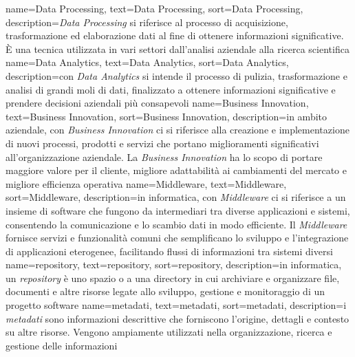 {
    name={Data Processing},
    text=Data Processing,
    sort=Data Processing,
    description={\textit{Data Processing} si riferisce al processo di acquisizione, trasformazione ed elaborazione dati al fine di 
    ottenere informazioni significative. È una tecnica utilizzata in vari settori dall'analisi aziendale alla ricerca scientifica}
}
{
    name={Data Analytics},
    text=Data Analytics,
    sort=Data Analytics,
    description={con \textit{Data Analytics} si intende il processo di pulizia, trasformazione e analisi di grandi moli di dati, finalizzato
    a ottenere informazioni significative e prendere decisioni aziendali più consapevoli}
}
{
    name={Business Innovation},
    text=Business Innovation,
    sort=Business Innovation,
    description={in ambito aziendale, con \textit{Business Innovation} ci si riferisce alla creazione e implementazione di nuovi processi, prodotti e servizi
    che portano miglioramenti significativi all'organizzazione aziendale. La \textit{Business Innovation} ha lo scopo di portare 
    maggiore valore per il cliente, migliore adattabilità ai cambiamenti del mercato e migliore efficienza operativa}
}
{
    name={Middleware},
    text=Middleware,
    sort=Middleware,
    description={in informatica, con \textit{Middleware} ci si riferisce a un insieme di software che fungono da intermediari tra diverse applicazioni 
    e sistemi, consentendo la comunicazione e lo scambio dati in modo efficiente. Il \textit{Middleware} fornisce servizi e funzionalità comuni che 
    semplificano lo sviluppo e l'integrazione di applicazioni eterogenee, facilitando flussi di informazioni tra sistemi diversi}
}
{
    name={repository},
    text=repository,
    sort=repository,
    description={in informatica, un \textit{repository} è uno spazio o a una directory in cui archiviare e organizzare
    file, documenti e altre risorse legate allo sviluppo, gestione e monitoraggio di un progetto software}
}
{
    name={metadati},
    text=metadati,
    sort=metadati,
    description={i \textit{metadati} sono informazioni descrittive che forniscono l'origine, dettagli e contesto su altre risorse. Vengono ampiamente utilizzati 
    nella organizzazione, ricerca e gestione delle informazioni} 
}
